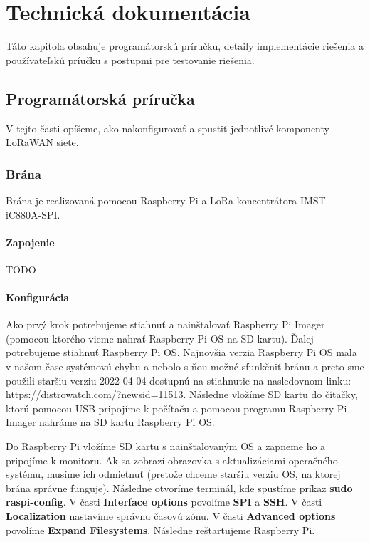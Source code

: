 \chapter{Technická dokumentácia}

Táto kapitola obsahuje programátorskú príručku, detaily implementácie riešenia a používateľskú príučku s postupmi pre testovanie riešenia.


\section{Programátorská príručka}

V tejto časti opíšeme, ako nakonfigurovať a spustiť jednotlivé komponenty LoRaWAN siete.

\subsection{Brána}

Brána je realizovaná pomocou Raspberry Pi a LoRa koncentrátora IMST iC880A-SPI.

\subsubsection{Zapojenie}

TODO

\subsubsection{Konfigurácia}

Ako prvý krok potrebujeme stiahnuť a nainštalovať Raspberry Pi Imager (pomocou ktorého vieme nahrať Raspberry Pi OS na SD kartu). Ďalej potrebujeme stiahnuť Raspberry Pi OS. Najnovšia verzia Raspberry Pi OS mala v našom čase systémovú chybu a nebolo s ňou možné sfunkčniť bránu a preto sme použili staršiu verziu 2022-04-04 dostupnú na stiahnutie na nasledovnom linku: https://distrowatch.com/?newsid=11513. Následne vložíme SD kartu do čítačky, ktorú pomocou USB pripojíme k počítaču a pomocou programu Raspberry Pi Imager nahráme na SD kartu Raspberry Pi OS. 

Do Raspberry Pi vložíme SD kartu s nainštalovaným OS a zapneme ho a pripojíme k monitoru. Ak sa zobrazí obrazovka s aktualizáciami operačného systému, musíme ich odmietnuť (pretože chceme staršiu verziu OS, na ktorej brána správne funguje). Následne otvoríme terminál, kde spustíme príkaz \textbf{sudo raspi-config}. V časti \textbf{Interface options} povolíme \textbf{SPI} a \textbf{SSH}. V časti \textbf{Localization} nastavíme správnu časovú zónu. V časti \textbf{Advanced options} povolíme \textbf{Expand Filesystems}. Následne reštartujeme Raspberry Pi.

